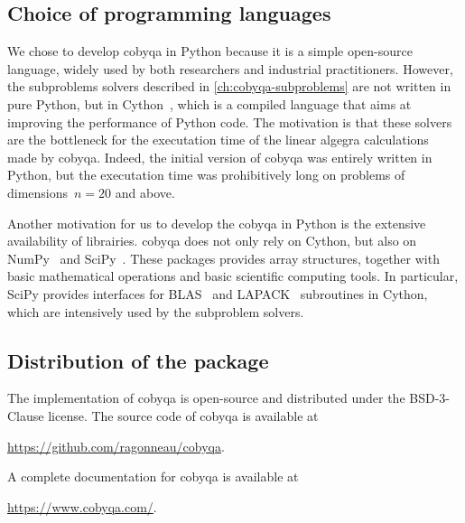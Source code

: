 \subsection{Choice of programming languages}

We chose to develop \gls{cobyqa} in Python because it is a simple open-source language, widely used by both researchers and industrial practitioners.
However, the subproblems solvers described in \cref{ch:cobyqa-subproblems} are not written in pure Python, but in Cython~\cite{Behnel_Etal_2011}, which is a compiled language that aims at improving the performance of Python code.
The motivation is that these solvers are the bottleneck for the executation time of the linear algegra calculations made by \gls{cobyqa}.
Indeed, the initial version of \gls{cobyqa} was entirely written in Python, but the executation time was prohibitively long on problems of dimensions~$n = 20$ and above.

Another motivation for us to develop the \gls{cobyqa} in Python is the extensive availability of librairies.
\Gls{cobyqa} does not only rely on Cython, but also on NumPy~\cite{Harris_Etal_2020} and SciPy~\cite{Virtanen_Etal_2020}.
These packages provides array structures, together with basic mathematical operations and basic scientific computing tools.
In particular, SciPy provides interfaces for BLAS~\cite{Blackford_Etal_2002} and LAPACK~\cite{Anderson_Etal_1999} subroutines in Cython, which are intensively used by the subproblem solvers.

\subsection{Distribution of the package}

The implementation of \gls{cobyqa} is open-source and distributed under the BSD-3-Clause license.
The source code of \gls{cobyqa} is available at
\begin{center}
    \url{https://github.com/ragonneau/cobyqa}.
\end{center}
A complete documentation for \gls{cobyqa} is available at
\begin{center}
    \url{https://www.cobyqa.com/}.
\end{center}

